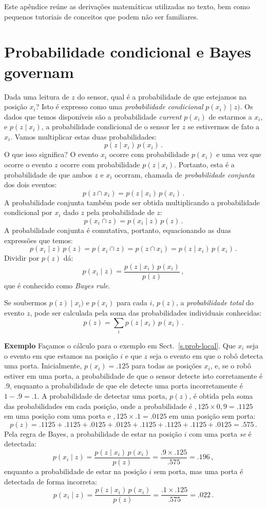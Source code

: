 Este apêndice reúne as derivações matemáticas utilizadas no texto, bem como pequenos tutoriais de conceitos que podem não ser familiares.

\section{Probabilidade condicional e Bayes governam}\label{a.bayes}

Dada uma leitura de $z$ do sensor, qual é a probabilidade de que estejamos na posição $x_i$? Isto é expresso como uma \emph{probabilidade condicional} $p(x_i)\mid z)$. Os dados que temos disponíveis são a probabilidade \emph{current} $p(x_i)$ de estarmos a $x_i$, e $p(z\mid x_i)$, a probabilidade condicional de o sensor ler $z$ se estivermos de fato a $x_i$. Vamos multiplicar estas duas probabilidades:
\[
p(z\mid x_i)\, p(x_i)\,.
\]
O que isso significa? O evento $x_i$ ocorre com probabilidade $p(x_i)$ e uma vez que ocorre o evento $z$ ocorre com probabilidade $p(z\mid x_i)$. Portanto, esta é a probabilidade de que ambos $z$ e $x_i$ ocorram, chamada de \emph{probabilidade conjunta} dos dois eventos:
\[
p(z \cap x_i) = p(z\mid x_i)\, p(x_i)\,.
\]
A probabilidade conjunta também pode ser obtida multiplicando a probabilidade condicional por $x_i$ dado $z$ pela probabilidade de $z$:
\[
p(x_i \cap z) = p(x_i\mid z)\, p(z)\,.
\]
A probabilidade conjunta é comutativa, portanto, equacionando as duas expressões que temos:
\[
p(x_i\mid z)\, p(z) = p(x_i \cap z) = p(z \cap x_i) = p(z\mid x_i)\, p(x_i)\,.
\]
Dividir por $p(z)$ dá:
\[
p(x_i\mid z)= \frac{p(z\mid x_i)\, p(x_i)}{p(z)}\,,
\]
que é conhecido como \emph{Bayes rule}.

Se soubermos $p(z)\mid x_i)$ e $p(x_i)$ para cada $i$, $p(z)$, a \emph{probabilidade total} do evento $z$, pode ser calculada pela soma das probabilidades individuais conhecidas:
\begin{displaymath}
p(z) = \sum_i p(z\mid x_i)\, p(x_i)\,.
\end{displaymath}

\noindent\textbf{Exemplo} Façamos o cálculo para o exemplo em Sect.~\ref{s.prob-local}. Que $x_i$ seja o evento em que estamos na posição $i$ e que $z$ seja o evento em que o robô detecta uma porta. Inicialmente, $p(x_i)=.125$ para todas as posições $x_i$, e, se o robô estiver em uma porta, a probabilidade de que o sensor detecte isto corretamente é $.9$, enquanto a probabilidade de que ele detecte uma porta incorretamente é $1-.9=.1$. A probabilidade de detectar uma porta, $p(z)$, é obtida pela soma das probabilidades em cada posição, onde a probabilidade é $,125\times 0,9 = .1125$ em uma posição com uma porta e $,125\times .1= .0125$ em uma posição sem porta:
\[
p(z)=.1125 + .1125 + .0125 + .0125 + .1125 + .1125 + .1125 + .0125 = .575\,.
\]
Pela regra de Bayes, a probabilidade de estar na posição $i$ com uma porta \emph{se} é detectada:
\[
p(x_i \mid z) = \frac{p(z\mid x_i)\, p(x_i)}{p(z)}=\frac{.9\times .125}{.575} = .196\,,
\]
enquanto a probabilidade de estar na posição $i$ sem porta, mas uma porta é detectada de forma incorreta:
\[
p(x_i \mid z) = \frac{p(z\mid x_i)\, p(x_i)}{p(z)}=\frac{.1\times .125}{.575} = .022\,.
\]

